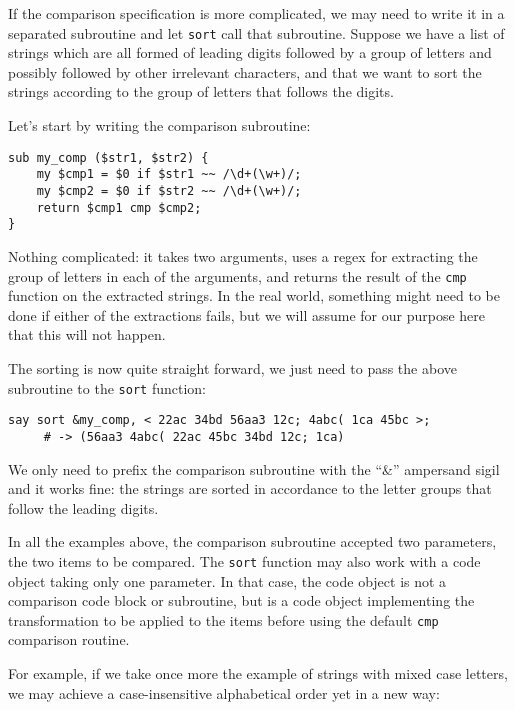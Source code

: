 If the comparison specification is more complicated, we 
may need to write it in a separated subroutine and let 
{\tt sort} call that subroutine. Suppose we have a list 
of strings which are all formed of leading digits 
followed by a group of letters and possibly followed by other 
irrelevant characters, and that we want to sort the 
strings according to the group of letters that follows 
the digits.

Let's start by writing the comparison subroutine:


\begin{verbatim}
sub my_comp ($str1, $str2) {
    my $cmp1 = $0 if $str1 ~~ /\d+(\w+)/; 
    my $cmp2 = $0 if $str2 ~~ /\d+(\w+)/; 
    return $cmp1 cmp $cmp2;
}
\end{verbatim}

Nothing complicated: it takes two arguments, uses a regex 
for extracting the group of letters in each of the 
arguments, and returns the result of the {\tt cmp} 
function on the extracted strings. In the real world, something 
might need to be done if either of the extractions fails, but 
we will assume for our purpose here that this will not happen.

The sorting is now quite straight forward, we just need to pass the above subroutine to the {\tt sort} function:

\begin{verbatim}
say sort &my_comp, < 22ac 34bd 56aa3 12c; 4abc( 1ca 45bc >;
     # -> (56aa3 4abc( 22ac 45bc 34bd 12c; 1ca)
\end{verbatim}

We only need to prefix the comparison subroutine with the 
``\&'' ampersand sigil and it works fine: the strings are sorted 
in accordance to the letter groups that follow the leading digits.

In all the examples above, the comparison subroutine 
accepted two parameters, the two items to be compared. 
The {\tt sort} function may also work with a code object 
taking only one parameter. In that case, the code object 
is not a comparison code block or subroutine, but is a 
code object implementing the transformation to be 
applied to the items before using the default {\tt cmp} 
comparison routine. 

For example, if we take once more the example of strings 
with mixed case letters, we may achieve a case-insensitive 
alphabetical order yet in a new way:

